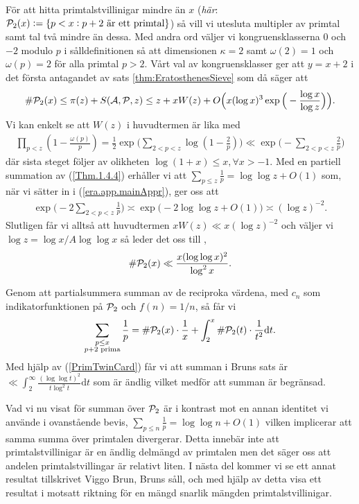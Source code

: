 För att hitta primtalstvillinigar mindre än $x$ (\textit{här}: \( \P_2(x) := \{p < x : p + 2 \text{ är ett primtal}\}\)) så vill vi utesluta multipler av primtal samt tal två mindre än dessa. Med andra ord väljer vi kongruensklasserna $0$ och $-2$ modulo $p$ i sålldefinitionen så att dimensionen \(\kappa = 2\) samt \(\omega(2) = 1\) och \(\omega(p) = 2\) för alla primtal $p > 2$. Vårt val av kongruensklasser ger att \(y = x + 2\) i det första antagandet av sats \ref{thm:EratosthenesSieve} som då säger att
\begin{align*}
    \card{\P_2(x)} \leq \pi(z) + \S{A}{P}{z} \leq z + x W(z) + O\Big(x (\log x)^3 \exp \Big( - \frac{\log x}{\log z} \Big) \Big).
\end{align*}
Vi kan enkelt se att \(W(z)\) i huvudtermen är lika med
\begin{align}
    \prod_{p < z}\left( 1 - \frac{\omega(p)}{p} \right) = \frac{1}{2} \exp \Bigg( \sum_{2 <p < z} \log \left( 1 - \frac{2}{p} \right) \Bigg) \ll \exp \Bigg( - \sum_{2 <p < z} \frac{2}{p}  \Bigg) \label{era.app.mainAppr}
\end{align}
där sista steget följer av olikheten \(\log(1 + x) \leq x, \forall x > -1\). Med en partiell summation av (\ref{Thm.1.4.4}) erhåller vi att \(\sum_{p \leq z} \frac{1}{p} = \log \log z + O(1)\) som, när vi sätter in i (\ref{era.app.mainAppr}), ger oss att
\begin{align} \label{era.app.secondMainAppr} 
    \exp \Bigg( - 2 \sum_{2 <p < z} \frac{1}{p}  \Bigg) \asymp \exp \big( -2 \log \log z + O(1)  \big) \asymp (\log z)^{-2}.
\end{align}
Slutligen får vi alltså att huvudtermen \(x W(z) \ll x (\log z)^{-2}\) och väljer vi \(\log z = \log x / A \log \log x\) så leder det oss till \cite[Sats 5.4.4]{cojocarumurty}, 
\begin{align} \label{PrimTwinCard}
    \card{\P_2(x)} \ll \frac{x (\log \log x)^2}{\log^2 x} .
\end{align}

Genom att partialsummera summan av de reciproka värdena, med \(c_n\) som indikatorfunktionen på \(\P_2\) och \(f(n) = 1 / n\), så får vi 
\begin{align*}
    \sum_{\substack{p \leq x \\ p + 2 \text{ prima}}} \frac{1}{p} = \card{\P_2(x)} \cdot \frac{1}{x} + \int_2^x \card{\P_2(t)} \cdot \frac{1}{t^2} \text{d}t . 
\end{align*}
Med hjälp av (\ref{PrimTwinCard}) får vi att summan i Bruns sats är \(\ll \int_2^\infty \frac{(\log \log t)^2}{t \log^2 t} \text{d}t\) som är ändlig vilket medför att summan är begränsad. 

Vad vi nu visat för summan över \(\P_2\) är i kontrast mot en annan identitet vi använde i ovanstående bevis, \(\sum_{p \leq n} \frac{1}{p} = \log \log n + O(1)\) vilken implicerar att samma summa över primtalen divergerar. Detta innebär inte att primtalstvillinigar är en ändlig delmängd av primtalen men det säger oss att andelen primtalstvillingar är relativt liten. I nästa del kommer vi se ett annat resultat tillskrivet Viggo Brun, Bruns såll, och med hjälp av detta visa ett resultat i motsatt riktning för en mängd snarlik mängden primtalstvillinigar. 